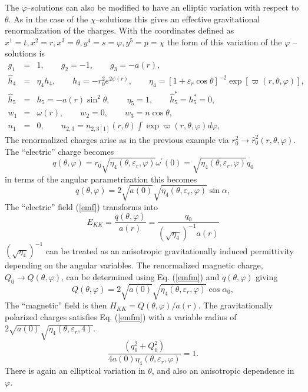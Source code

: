 \documentclass[a4paper,preprint,prabib,aps]{revtex4}
\begin{document}
The $\varphi $--solutions can also be modified to have an elliptic variation
with respect to $\theta $. As in the case of the $\chi $--solutions this
gives an effective gravitational renormalization of the charges. With the
coordinates defined as $x^{1}=t,x^{2}=r,x^{3}=\theta ,y^{4}=s=\varphi
,y^{5}=p=\chi $ the form of this variation of the $\varphi $ -- solutions is
\begin{eqnarray}
g_{1} &=&1,\qquad g_{2}=-1,\qquad g_{3}=-a(r),  \label{set4b} \\
\widehat{h}_{4} &=&\eta _{4}h_{4},\qquad h_{4}=-r_{0}^{2}e^{2\psi
(r)},\qquad \eta _{4}=\left[ 1+\varepsilon _{r}\cos \theta \right] ^{-2}\exp
[\varpi (r,\theta ,\varphi )],  \nonumber \\
\widehat{h}_{5} &=&h_{5}=-a(r)\sin ^{2}\theta ,\qquad \eta _{5}=1,\qquad
\widehat{h}_{5}^{\ast }=h_{5}^{\ast }=0,  \nonumber \\
w_{1} &=&\omega (r),\qquad w_{2}=0,\qquad w_{3}=n\cos \theta ,  \nonumber \\
n_{1} &=&0,\qquad n_{2,3}=n_{2,3[1]}(r,\theta )\int \exp \varpi (r,\theta
,\varphi )d\varphi ,  \nonumber
\end{eqnarray}
The renormalized charges arise as in the previous example via $%
r_{0}^{2}\rightarrow \widehat{r}_{0}^{2}(r,\theta ,\varphi )$. The
``electric'' charge becomes
\[
q(\theta ,\varphi )=r_{0}\sqrt{\eta _{4}(\theta ,\varepsilon _{r},\varphi )}%
\omega ^{\prime }(0)=\sqrt{\eta _{4}(\theta ,\varepsilon _{r},\varphi )}q_{0}
\]
in terms of the angular parametrization this becomes
\[
q(\theta ,\varphi )=2\sqrt{a(0)}\sqrt{\eta _{4}(\theta ,\varepsilon
_{r},\varphi )}\sin \alpha ,
\]
The ``electric'' field (\ref{emf}) transforms into
\[
E_{KK}=\frac{q(\theta ,\varphi )}{a(r)}=\frac{q_{0}}{(\sqrt{\eta _{4}}%
)^{-1}a(r)}
\]
$(\sqrt{\eta _{4}})^{-1}$ can be treated as an anisotropic gravitationally
induced permittivity depending on the angular variables. The renormalized
magnetic charge, $Q_{0}\rightarrow Q(\theta ,\varphi )$, can be determined
using Eq. (\ref{emfm}) and $q(\theta ,\varphi )$ giving
\[
Q(\theta ,\varphi )=2\sqrt{a(0)}\sqrt{\eta _{4}(\theta ,\varepsilon
_{r},\varphi )}\cos \alpha _{0},
\]
The ``magnetic'' field is then $H_{KK}=Q(\theta ,\varphi )/a(r)$. The
gravitationally polarized charges satisfies Eq. (\ref{emfm}) with a variable
radius of $2\sqrt{a(0)}\sqrt{\eta _{4}(\theta ,\varepsilon _{r},4)}$.
\begin{equation}
\frac{(q_{0}^{2}+Q_{0}^{2})}{4a(0)\eta _{4}(\theta ,\varepsilon _{r},\varphi
)}{=1.}  \label{emfm2}
\end{equation}
There is again an elliptical variation in $\theta $, and also an anisotropic
dependence in $\varphi $.
\end{document}
